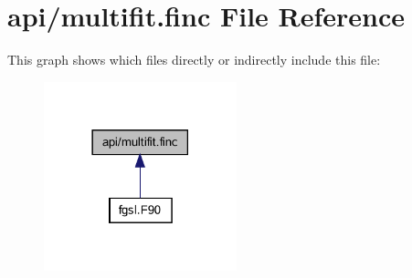 \hypertarget{multifit_8finc}{}\section{api/multifit.finc File Reference}
\label{multifit_8finc}
This graph shows which files directly or indirectly include this file\+:\nopagebreak
\begin{figure}[H]
\begin{center}
\leavevmode
\includegraphics[width=158pt]{multifit_8finc__dep__incl}
\end{center}
\end{figure}
